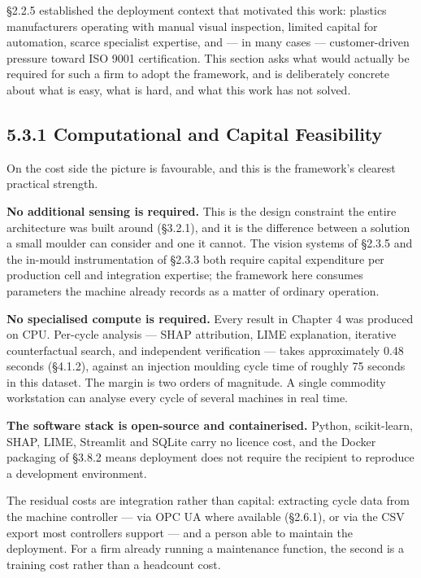 §2.2.5 established the deployment context that motivated this work: plastics manufacturers operating with manual visual inspection, limited capital for automation, scarce specialist expertise, and --- in many cases --- customer-driven pressure toward ISO 9001 certification. This section asks what would actually be required for such a firm to adopt the framework, and is deliberately concrete about what is easy, what is hard, and what this work has not solved.

\hypertarget{computational-and-capital-feasibility}{%
\subsection{5.3.1 Computational and Capital Feasibility}\label{computational-and-capital-feasibility}}

On the cost side the picture is favourable, and this is the framework's clearest practical strength.

\textbf{No additional sensing is required.} This is the design constraint the entire architecture was built around (§3.2.1), and it is the difference between a solution a small moulder can consider and one it cannot. The vision systems of §2.3.5 and the in-mould instrumentation of §2.3.3 both require capital expenditure per production cell and integration expertise; the framework here consumes parameters the machine already records as a matter of ordinary operation.

\textbf{No specialised compute is required.} Every result in Chapter 4 was produced on CPU. Per-cycle analysis --- SHAP attribution, LIME explanation, iterative counterfactual search, and independent verification --- takes approximately 0.48 seconds (§4.1.2), against an injection moulding cycle time of roughly 75 seconds in this dataset. The margin is two orders of magnitude. A single commodity workstation can analyse every cycle of several machines in real time.

\textbf{The software stack is open-source and containerised.} Python, scikit-learn, SHAP, LIME, Streamlit and SQLite carry no licence cost, and the Docker packaging of §3.8.2 means deployment does not require the recipient to reproduce a development environment.

The residual costs are integration rather than capital: extracting cycle data from the machine controller --- via OPC UA where available (§2.6.1), or via the CSV export most controllers support --- and a person able to maintain the deployment. For a firm already running a maintenance function, the second is a training cost rather than a headcount cost.

